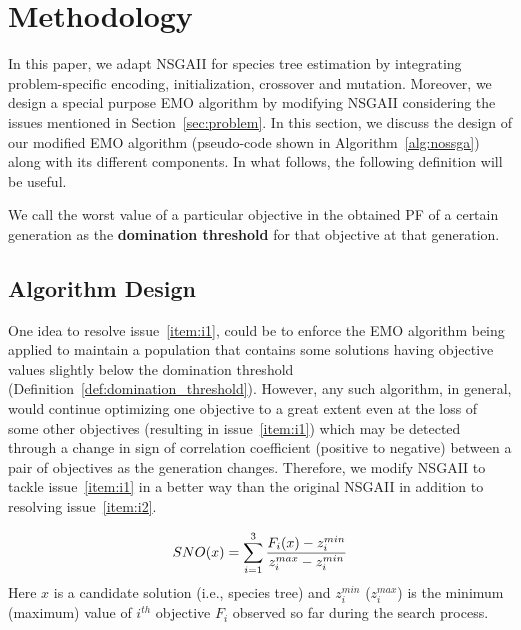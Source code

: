\section{Methodology}
\label{sec:method}
In this paper, we adapt NSGAII for species tree estimation by integrating problem-specific encoding, initialization, crossover and mutation. Moreover, we design a special purpose EMO algorithm by modifying NSGAII considering the issues mentioned in Section~\ref{sec:problem}. In this section, we discuss the design of our modified EMO algorithm (pseudo-code shown in Algorithm~\ref{alg:nossga}) along with its different components. In what follows, the following definition will be useful. %

\begin{definition}\label{def:domination_threshold}
	\small
	We call the worst value of a particular objective in the obtained PF of a certain generation as the \textbf{domination threshold} for that objective at that generation.
\end{definition}

\subsection{Algorithm Design}
One idea to resolve issue~\ref{item:i1}, could be to enforce the EMO algorithm being applied to maintain a population that contains some solutions having objective values slightly below the domination threshold (Definition~\ref{def:domination_threshold}). However, any such algorithm, in general, would continue optimizing one objective to a great extent even at the loss of some other objectives (resulting in issue~\ref{item:i1}) which may be detected through a change in sign of correlation coefficient (positive to negative)  between a pair of objectives as the generation changes. 
Therefore, we modify NSGAII to tackle issue~\ref{item:i1} in a better way than the original NSGAII in addition to resolving issue~\ref{item:i2}.  

\begin{equation}\label{eqn:nos}
\small
SNO(x) = \sum_{i=1}^{3} \frac{F_i(x)-z_i^{min}}{z_i^{max}-z_i^{min}}
\end{equation}
Here $x$ is a candidate solution (i.e., species tree) and $z_i^{min}$ ($z_i^{max}$) is the minimum (maximum) value of $i^{th}$ objective $F_i$ observed so far during the search process.

